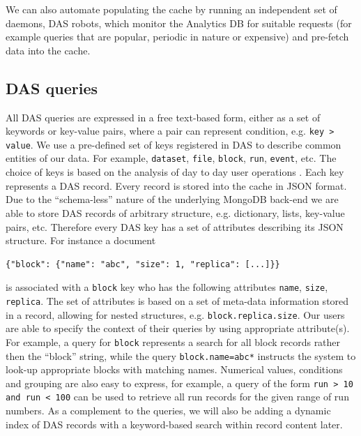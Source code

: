\documentclass[1p,times]{elsarticle}
\begin{document}
We can also automate populating the cache by running an 
independent set of daemons, DAS robots, which monitor the 
Analytics DB for suitable requests (for example queries that are 
popular, periodic in nature or expensive) and pre-fetch data into the cache. 

\subsection{DAS queries}
All DAS queries are expressed in a free text-based form, either as a 
set of keywords or key-value pairs, where a pair can represent
condition, e.g. \verb+key > value+. We use a pre-defined set of keys registered 
in DAS to describe common entities of our data. For example, \verb+dataset+, 
\verb+file+, \verb+block+, \verb+run+, \verb+event+, etc. The choice of keys
is based on the analysis of day to day user operations \cite{DBS07}.
Each key represents a DAS record. Every record is stored into the cache
in JSON format. Due to the ``schema-less'' nature of the underlying MongoDB
back-end we are able to store DAS records of arbitrary structure, e.g.
dictionary, lists, key-value pairs, etc. Therefore every DAS key has a 
set of attributes describing its JSON structure. For instance a document
\begin{verbatim}
{"block": {"name": "abc", "size": 1, "replica": [...]}}
\end{verbatim}
is associated with a \verb+block+ key who has the following attributes
\verb+name+, \verb+size+, \verb+replica+. The set of attributes is based 
on a set of meta-data information stored in a record, allowing
for nested structures, e.g. \verb+block.replica.size+. Our users 
are able to specify the context of their queries by using appropriate 
attribute(s). For example, a query for \verb+block+ represents a search for all
block records rather then the ``block'' string, while the query
\verb+block.name=abc*+ instructs the system to look-up appropriate blocks
with matching names. Numerical values, conditions and grouping are
also easy to express, for example, a query
of the form \verb+run > 10 and run < 100+ can be used to
retrieve all run records for the given range of run numbers. 
As a complement to the queries, we will also be adding a dynamic index
of DAS records with a keyword-based search within record content later.
\end{document}
